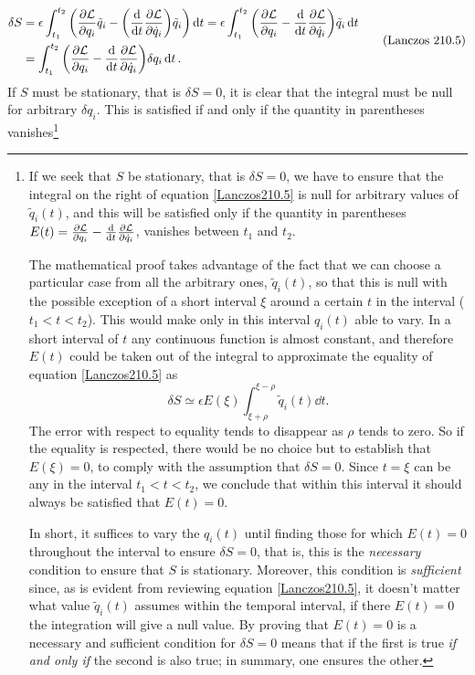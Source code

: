 \documentclass[12pt, english, a4paper]{article}
\begin{document}
\begin{equation}\label{Lanczos210.5}
	\begin{aligned}
    \delta S &=
    \epsilon \int_{t_1}^{t_2 } \pqty{\pdv{\mathcal{L}}{q_i} \tilde{q}_i - \pqty{ \dv{t} \pdv{\mathcal{L}}{\dot{q}_i} } \tilde{q}_i } \dd{t} =
    \epsilon \int_{t_1}^{t_2 } \pqty{\pdv{\mathcal{L}}{q_i} - \dv{t} \pdv{\mathcal{L}}{\dot{q}_i} } \tilde{q}_i \dd{t} \\
		&= \int_{t_1}^{t_2 } \pqty{\pdv{\mathcal{L}}{q_i} - \dv{t} \pdv{\mathcal{L}}{\dot{q}_i} } \delta q_i \dd{t}.
	\end{aligned}
	\tag{Lanczos 210.5}
\end{equation}
If \(S\) must be stationary, that is \(\delta S = 0\), it is clear that the integral must be null for arbitrary \(\delta q_i\).
This is satisfied if and only if the quantity in parentheses vanishes\footnote{
If we seek that \(S\) be stationary, that is \(\delta S = 0\), we have to ensure that the integral on the right of equation \eqref{Lanczos210.5} is null for arbitrary values of \(\tilde{q}_i (t)\), and this will be satisfied only if the quantity in parentheses \(E(t)= \pdv{\mathcal{L}}{q_i} - \dv{t} \pdv{\mathcal{L}}{\dot{q}_i}\), vanishes between \(t_1\) and \(t_2\).

The mathematical proof takes advantage of the fact that we can choose a particular case from all the arbitrary ones, \(\tilde{q}_i (t)\), so that this is null with the possible exception of a short interval \(\xi\) around a certain \(t\) in the interval (\(t_1 < t < t_2\)).
This would make only in this interval \(q_i(t)\) able to vary.
In a short interval of \(t\) any continuous function is almost constant, and therefore \(E(t)\) could be taken out of the integral to approximate the equality of equation \eqref{Lanczos210.5} as
\begin{equation}\label{Lanczos210.8}
    \delta S \simeq \epsilon E(\xi) \int_{\xi+ \rho}^{\xi - \rho} \tilde{q}_i (t) \dd{t}.
    \tag{Lanczos 210.8}
\end{equation}
The error with respect to equality tends to disappear as \(\rho\) tends to zero.
So if the equality is respected, there would be no choice but to establish that \(E(\xi) = 0\), to comply with the assumption that \(\delta S=0\).
Since \(t=\xi\) can be any in the interval \(t_1<t<t_2\), we conclude that within this interval it should always be satisfied that \(E(t)=0\).

In short, it suffices to vary the \(q_i(t)\) until finding those for which \(E(t) = 0\) throughout the interval to ensure \(\delta S = 0\), that is, this is the \emph{necessary} condition to ensure that \(S\) is stationary.
Moreover, this condition is \emph{sufficient} since, as is evident from reviewing equation \eqref{Lanczos210.5}, it doesn't matter what value \(\tilde{q}_i (t)\) assumes within the temporal interval, if there \(E(t) =0 \) the integration will give a null value.
By proving that \(E(t) = 0\) is a necessary and sufficient condition for \(\delta S = 0\) means that if the first is true \emph{if and only if} the second is also true;
in summary, one ensures the other.
}
\end{document}
